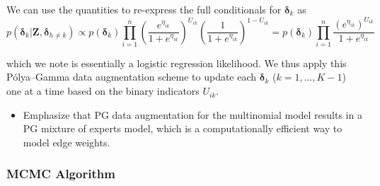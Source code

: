 \documentclass[useAMS,referee]{biom}
\begin{document}
We can use the quantities to re-express the full conditionals for $\boldsymbol\delta_k$ as
$$p(\boldsymbol\delta_k|\mathbf{Z},\boldsymbol\delta_{h \ne k}) \propto p(\boldsymbol\delta_k) \prod_{i = 1}^{n} \left (\frac{e^{\eta_{ik}}}{1 + e^{\eta_{ik}}} \right )^{U_{ik}} \left (\frac{1}{1 + e^{\eta_{ik}}} \right )^{1-U_{ik}} = p(\boldsymbol\delta_k) \prod_{i = 1}^n \frac{(e^{\eta_{ik}})^{U_{ik}}}{1 + e^{\eta_{ik}}}$$

which we note is essentially a logistic regression likelihood. We thus apply this P\'olya--Gamma data augmentation scheme to update each $\boldsymbol\delta_k$ ($k = 1,...,K-1$) one at a time based on the binary indicators $U_{ik}$.

\begin{itemize}

\item Emphasize that PG data augmentation for the multinomial model results in a PG mixture of experts model, which is a computationally efficient way to model edge weights.

\end{itemize}

\subsubsection{MCMC Algorithm}
\end{document}
